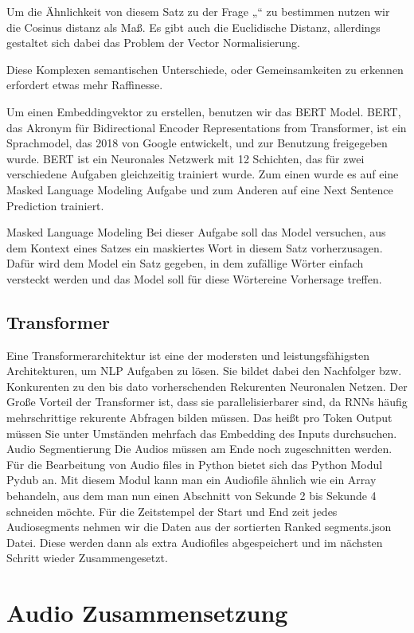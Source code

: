 Um die Ähnlichkeit von diesem Satz zu der Frage „“ zu bestimmen nutzen wir die Cosinus distanz als Maß. Es gibt auch die Euclidische Distanz, allerdings gestaltet sich dabei das Problem der Vector Normalisierung.


Diese Komplexen semantischen Unterschiede, oder Gemeinsamkeiten zu erkennen erfordert etwas mehr Raffinesse. 

Um einen Embeddingvektor zu erstellen, benutzen wir das BERT Model. BERT, das Akronym für Bidirectional Encoder Representations from Transformer, ist ein Sprachmodel, das 2018 von Google entwickelt, und zur Benutzung freigegeben wurde. BERT ist ein Neuronales Netzwerk mit 12 Schichten, das für zwei verschiedene Aufgaben gleichzeitig trainiert wurde. Zum einen wurde es auf eine Masked Language Modeling Aufgabe und zum Anderen auf eine Next Sentence Prediction trainiert. 

Masked Language Modeling
Bei dieser Aufgabe soll das Model versuchen, aus dem Kontext eines Satzes ein maskiertes Wort in diesem Satz vorherzusagen. Dafür wird dem Model ein Satz gegeben, in dem zufällige Wörter einfach versteckt werden und das Model soll für diese Wörtereine Vorhersage treffen. 

\subsection{Transformer}


Eine Transformerarchitektur ist eine der modersten und leistungsfähigsten Architekturen, um NLP Aufgaben zu lösen. Sie bildet dabei den Nachfolger bzw. Konkurenten zu den bis dato vorherschenden Rekurenten Neuronalen Netzen. Der Große Vorteil der Transformer ist, dass sie parallelisierbarer sind, da RNNs häufig mehrschrittige rekurente Abfragen bilden müssen. Das heißt pro Token Output müssen Sie unter Umständen mehrfach das Embedding des Inputs durchsuchen. Audio Segmentierung Die Audios müssen am Ende noch zugeschnitten werden. 
Für die Bearbeitung von Audio files in Python bietet sich das Python Modul Pydub an. Mit diesem Modul kann man ein Audiofile ähnlich wie ein Array behandeln, aus dem man nun einen Abschnitt von Sekunde 2 bis Sekunde 4 schneiden möchte. 
Für die Zeitstempel der Start und End zeit jedes Audiosegments nehmen wir die Daten aus der sortierten Ranked segments.json Datei.
Diese werden dann als extra Audiofiles abgespeichert und im nächsten Schritt wieder Zusammengesetzt.

\section{Audio Zusammensetzung}


